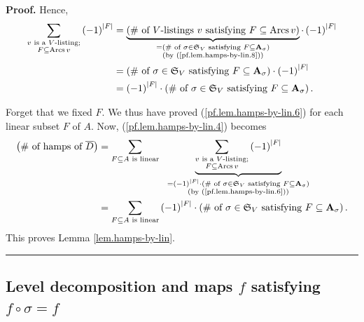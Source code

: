 \documentclass[numbers=enddot,12pt,final,onecolumn,notitlepage]{scrartcl}%
\numberwithin{exer}{section}
\theoremstyle{definition}
\newenvironment{proof}[1][Proof]{\noindent\textbf{#1.} }{\ \rule{0.5em}{0.5em}}
\let\sumnonlimits\sum
\renewcommand{\sum}{\sumnonlimits\limits}
\newenvironment{verlong}{}{}
\begin{document}
\begin{verlong}
\begin{proof}
Hence,%
\begin{align}
\sum_{\substack{v\text{ is a }V\text{-listing;}\\F\subseteq
\operatorname*{Arcs}v}}\left(  -1\right)  ^{\left\vert F\right\vert }  &
=\underbrace{\left(  \text{\# of }V\text{-listings }v\text{ satisfying
}F\subseteq\operatorname*{Arcs}v\right)  }_{\substack{=\left(  \text{\# of
}\sigma\in\mathfrak{S}_{V}\text{ satisfying }F\subseteq\mathbf{A}_{\sigma
}\right)  \\\text{(by (\ref{pf.lem.hamps-by-lin.8}))}}}\cdot\left(  -1\right)
^{\left\vert F\right\vert }\nonumber\\
&  =\left(  \text{\# of }\sigma\in\mathfrak{S}_{V}\text{ satisfying
}F\subseteq\mathbf{A}_{\sigma}\right)  \cdot\left(  -1\right)  ^{\left\vert
F\right\vert }\nonumber\\
&  =\left(  -1\right)  ^{\left\vert F\right\vert }\cdot\left(  \text{\# of
}\sigma\in\mathfrak{S}_{V}\text{ satisfying }F\subseteq\mathbf{A}_{\sigma
}\right)  . \label{pf.lem.hamps-by-lin.6}%
\end{align}


Forget that we fixed $F$. We thus have proved (\ref{pf.lem.hamps-by-lin.6})
for each linear subset $F$ of $A$. Now, (\ref{pf.lem.hamps-by-lin.4}) becomes%
\begin{align*}
\left(  \text{\# of hamps of }\overline{D}\right)   &  =\sum_{F\subseteq
A\text{ is linear}}\ \ \underbrace{\sum_{\substack{v\text{ is a }%
V\text{-listing;}\\F\subseteq\operatorname*{Arcs}v}}\left(  -1\right)
^{\left\vert F\right\vert }}_{\substack{=\left(  -1\right)  ^{\left\vert
F\right\vert }\cdot\left(  \text{\# of }\sigma\in\mathfrak{S}_{V}\text{
satisfying }F\subseteq\mathbf{A}_{\sigma}\right)  \\\text{(by
(\ref{pf.lem.hamps-by-lin.6}))}}}\\
&  =\sum_{F\subseteq A\text{ is linear}}\left(  -1\right)  ^{\left\vert
F\right\vert }\cdot\left(  \text{\# of }\sigma\in\mathfrak{S}_{V}\text{
satisfying }F\subseteq\mathbf{A}_{\sigma}\right)  .
\end{align*}
This proves Lemma \ref{lem.hamps-by-lin}.
\end{proof}
\end{verlong}

\subsection{Level decomposition and maps $f$ satisfying $f\circ\sigma=f$}
\end{document}
